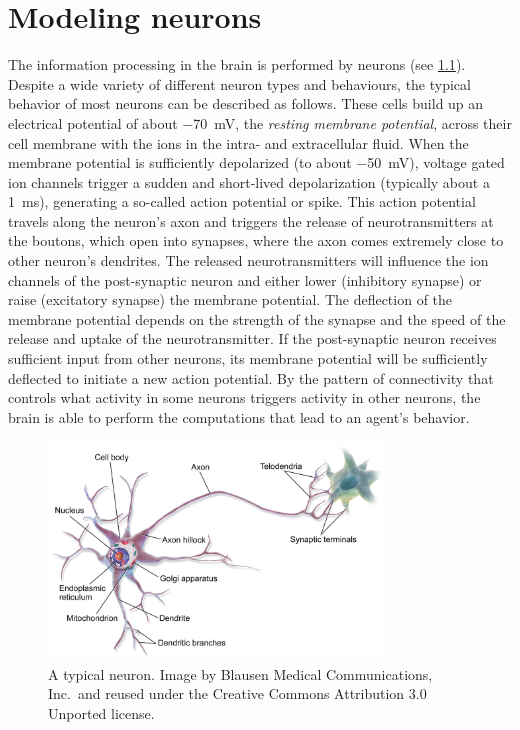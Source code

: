 \chapter{Modeling neurons}\label{sec:neurons}
The information processing in the brain is performed by neurons (see \cref{fig:neuron}).
Despite a wide variety of different neuron types and behaviours, the typical behavior of most neurons can be described as follows.
These cells build up an electrical potential of about \SI{-70}{\milli\volt}, the \emph{resting membrane potential}, across their cell membrane with the ions in the intra- and extracellular fluid.
When the membrane potential is sufficiently depolarized (to about \SI{-50}{\milli\volt}), voltage gated ion channels trigger a sudden and short-lived depolarization (typically about a \SI{1}{\milli\second}), generating a so-called action potential or spike.
This action potential travels along the neuron's axon and triggers the release of neurotransmitters at the boutons, which open into synapses, where the axon comes extremely close to other neuron's dendrites.
The released neurotransmitters will influence the ion channels of the post-synaptic neuron and either lower (inhibitory synapse) or raise (excitatory synapse) the membrane potential.
The deflection of the membrane potential depends on the strength of the synapse and the speed of the release and uptake of the neurotransmitter.
If the post-synaptic neuron receives sufficient input from other neurons, its membrane potential will be sufficiently deflected to initiate a new action potential.
By the pattern of connectivity that controls what activity in some neurons triggers activity in other neurons, the brain is able to perform the computations that lead to an agent's behavior.

\begin{figure}
    \centering
    \includegraphics[width=0.8\textwidth]{figures/Blausen_0657_MultipolarNeuron}
    \caption[A typical neuron.]{A typical neuron. Image by Blausen Medical Communications, Inc.\ and reused under the Creative Commons Attribution 3.0 Unported license.}\label{fig:neuron}
\end{figure}

